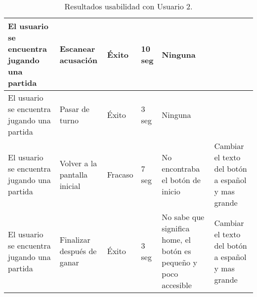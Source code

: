 \begin{table}[h]
\begin{center}
\begin{tabular}{|p{2.5cm}|p{1.75cm}|p{1.25cm}|p{1.25cm}|p{2.75cm}|p{3.5cm}|}
      \hline
      El usuario se encuentra jugando una partida
      & Escanear acusación
      & Éxito
      & 10 seg
      & Ninguna
      &\\

      \hline
      El usuario se encuentra jugando una partida
      & Pasar de turno
      & Éxito
      & 3 seg
      & Ninguna
      &\\

      \hline
      El usuario se encuentra jugando una partida
      & Volver a la pantalla inicial
      & Fracaso
      & 7 seg
      & No encontraba el botón de inicio
      & Cambiar el texto del botón a español y mas grande\\

      \hline
      El usuario se encuentra jugando una partida
      & Finalizar después de ganar
      & Éxito
      & 3 seg
      & No sabe que significa home, el botón es pequeño y poco accesible
      & Cambiar el texto del botón a español y mas grande\\

      \hline

    \end{tabular}

    \caption{Resultados usabilidad con Usuario 2.}
    \label{tabla-bocetos-usuario2}

  \end{center}
\end{table}


